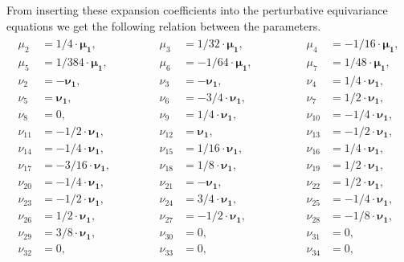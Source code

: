 \documentclass[a4paper,12pt, DIV=14, BCOR=5mm, twoside, headsepline]{scrbook}
\begin{document}
From inserting these expansion coefficients into the perturbative equivariance equations we get the following relation between the parameters.
\begin{align}\label{GRSol}
\begin{alignedat}{3}
\mu_{{2}} &= 1/4\cdot \boldsymbol{\mu_1} , \hspace{2cm}    &  \mu_{{3}}   &= 1/32\cdot \boldsymbol{\mu_1} , \hspace{2cm}   & \mu_{{4}}   &= -1/16\cdot  \boldsymbol{\mu_1} , \\
%
\mu_{{5}} &= 1/384\cdot \boldsymbol{\mu_1} ,  &  \mu_{{6}}   &= -1/64\cdot \boldsymbol{\mu_1} ,  & \mu_{{7}}   &= 1/48\cdot \boldsymbol{\mu_1} , \\
%
\nu_{{2}} &= - \boldsymbol{\nu_1} ,  & \nu_{{3}}   &= - \boldsymbol{\nu_1} ,  & \nu_{{4}}   &= 1/4\cdot \boldsymbol{\nu_1} , \\
%
\nu_{{5}} &= \boldsymbol{\nu_1} ,  & \nu_{{6}}   &= -3/4 \cdot  \boldsymbol{\nu_1} ,   & \nu_{{7}}    &= 1/2\cdot \boldsymbol{\nu_1} , \\
%
\nu_{{8}} &=  0 ,  & \nu_{{9}}   &= 1/4\cdot \boldsymbol{\nu_1} ,   & \nu_{{10}}    &= -1/4 \cdot  \boldsymbol{\nu_1} , \\
%
\nu_{{11}} &= -1/2\cdot \boldsymbol{\nu_1} ,  &  \nu_{{12}}   &= \boldsymbol{\nu_1} ,   & \nu_{{13}}    &= -1/2\cdot \boldsymbol{\nu_1} , \\
%
\nu_{{14}} &= -1/4\cdot \boldsymbol{\nu_1} ,  &  \nu_{{15}}   &= 1/16\cdot \boldsymbol{\nu_1} ,   & \nu_{{16}}    &= 1/4\cdot \boldsymbol{\nu_1} , \\
%
\nu_{{17}} &= -3/16\cdot \boldsymbol{\nu_1} ,  &  \nu_{{18}}   &= 1/8\cdot \boldsymbol{\nu_1} ,   & \nu_{{19}}    &= 1/2\cdot \boldsymbol{\nu_1} , \\
%
\nu_{{20}} &= -1/4\cdot \boldsymbol{\nu_1} ,  & \nu_{{21}}   &= - \boldsymbol{\nu_1} ,   & \nu_{{22}}    &= 1/2\cdot \boldsymbol{\nu_1} , \\
%
\nu_{{23}} &= -1/2\cdot \boldsymbol{\nu_1} ,  & \nu_{{24}}   &= 3/4\cdot \boldsymbol{\nu_1} ,   & \nu_{{25}}    &= -1/4\cdot \boldsymbol{\nu_1} , \\
%
\nu_{{26}} &= 1/2\cdot \boldsymbol{\nu_1} ,  & \nu_{{27}}   &= -1/2\cdot \boldsymbol{\nu_1} ,   & \nu_{{28}}    &= -1/8\cdot \boldsymbol{\nu_1} , \\
%
\nu_{{29}} &= 3/8\cdot \boldsymbol{\nu_1} ,  & \nu_{{30}}   &=0 ,   & \nu_{{31}}    &= 0 , \\
%
\nu_{{32}} &= 0 ,  & \nu_{{33}}   &= 0 ,   &  \nu_{{34}}    &=  0 , \\

\end{alignedat}
\end{align}
\end{document}
